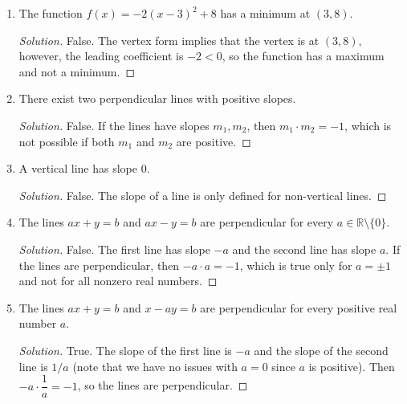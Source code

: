 \documentclass[12pt]{article}
\newenvironment{solution}{\begin{proof}[Solution]}{\end{proof}}
\begin{document}
\begin{enumerate}
\begin{enumerate}
\begin{solution}
			\end{solution}
			\item The function $f(x)=-2(x-3)^2+8$ has a minimum at $(3,8)$.
			\begin{solution}
				False. The vertex form implies that the vertex is at $(3,8)$, however, the leading coefficient is $-2<0$, so the function has a maximum and not a minimum.
			\end{solution}
			\item There exist two perpendicular lines with positive slopes.
			\begin{solution}
				False. If the lines have slopes $m_1, m_2$, then $m_1\cdot m_2=-1$, which is not possible if both $m_1$ and $m_2$ are positive.
			\end{solution}
			\item A vertical line has slope 0.
			\begin{solution}
				False. The slope of a line is only defined for non-vertical lines.
			\end{solution}
			\item The lines $ax+y=b$ and $ax-y=b$ are perpendicular for every $a\in\mathbb{R}\setminus\{0\}$.
			\begin{solution}
				False. The first line has slope $-a$ and the second line has slope $a$. If the lines are perpendicular, then $-a\cdot a=-1$, which is true only for $a=\pm1$ and not for all nonzero real numbers.
			\end{solution}
			\item The lines $ax+y=b$ and $x-ay=b$ are perpendicular for every positive real number $a$.
			\begin{solution}
				True. The slope of the first line is $-a$ and the slope of the second line is $1/a$ (note that we have no issues with $a=0$ since $a$ is positive). Then $-a\cdot \dfrac{1}{a}=-1$, so the lines are perpendicular.
			\end{solution}
		\end{enumerate}
		
	\end{enumerate}
	
\end{document}
